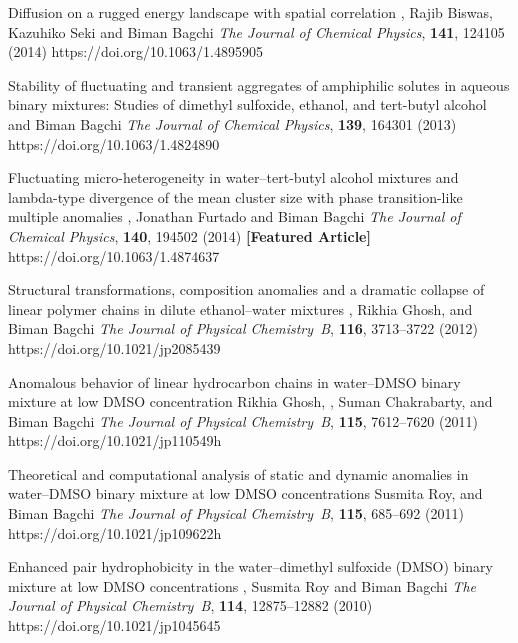 \begin{cvpubs}
%
        {Diffusion on a rugged energy landscape with spatial correlation}
        {\selfauthor{}, Rajib Biswas, Kazuhiko Seki and Biman Bagchi}
        {{\slshape The Journal of Chemical Physics}, {\bfseries 141}, 124105 (2014)}
        {https://doi.org/10.1063/1.4895905}


%
        {Stability of fluctuating and transient aggregates of amphiphilic solutes
        in aqueous binary mixtures: Studies of dimethyl sulfoxide, ethanol, and tert-butyl alcohol}
        {\selfauthor{} and Biman Bagchi}
        {{\slshape The Journal of Chemical Physics}, {\bfseries 139}, 164301 (2013)}
        {https://doi.org/10.1063/1.4824890}

%
        {Fluctuating micro-heterogeneity in water--tert-butyl alcohol mixtures and
        lambda-type divergence of the mean cluster size with phase transition-like
        multiple anomalies}
        {\selfauthor{}, Jonathan Furtado and Biman Bagchi}
        {{\slshape The Journal of Chemical Physics}, {\bfseries 140}, 194502 (2014) {\bfseries [Featured Article]}}
        {https://doi.org/10.1063/1.4874637}

%
        {Structural transformations, composition anomalies and a dramatic
        collapse of linear polymer chains in dilute ethanol--water mixtures}
        {\selfauthor{}, Rikhia Ghosh, and Biman Bagchi}
        {{\slshape The Journal of Physical Chemistry~B}, {\bfseries 116}, 3713--3722 (2012)}
        {https://doi.org/10.1021/jp2085439}

%
        {Anomalous behavior of linear hydrocarbon chains in water--DMSO
        binary mixture at low DMSO concentration}
        {Rikhia Ghosh, \selfauthor{}, Suman Chakrabarty, and Biman Bagchi}
        {{\slshape The Journal of Physical Chemistry~B}, {\bfseries 115}, 7612--7620 (2011)}
        {https://doi.org/10.1021/jp110549h}

%
        {Theoretical and computational analysis of static and dynamic anomalies
        in water--DMSO binary mixture at low DMSO concentrations}
        {Susmita Roy, \selfauthor{} and Biman Bagchi}
        {{\slshape The Journal of Physical Chemistry~B}, {\bfseries 115}, 685--692 (2011)}
        {https://doi.org/10.1021/jp109622h}

%
        {Enhanced pair hydrophobicity in the water--dimethyl sulfoxide (DMSO)
        binary mixture at low DMSO concentrations}
        {\selfauthor{}, Susmita Roy and Biman Bagchi}
        {{\slshape The Journal of Physical Chemistry~B}, {\bfseries 114}, 12875--12882 (2010)}
        {https://doi.org/10.1021/jp1045645}

\end{cvpubs}
